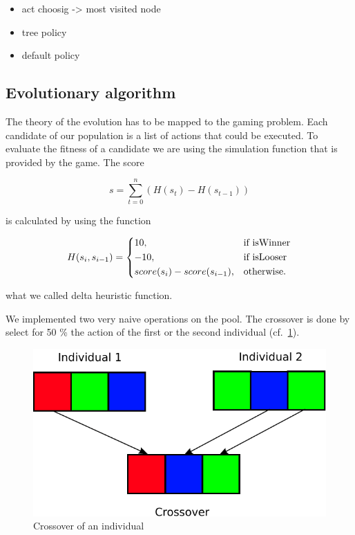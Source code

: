 \begin{itemize}
  \item act choosig -> most visited node
  \item tree policy
  \item default policy
\end{itemize}



\subsection{Evolutionary algorithm} 

The theory of the evolution has to be mapped to the gaming problem. Each candidate of our population is
a list of actions that could be executed. To evaluate the fitness of a candidate we are using the
simulation function that is provided by the game. 
The score

\begin{equation}
s = \sum_{t=0}^n (H(s_t) - H(s_{t-1}))
\end{equation}

is calculated by using the function

\begin{equation}
    H(s_i, s_{i-1}) = 
\begin{dcases}
    10, & \text{if isWinner}  \\
    -10, & \text{if isLooser}  \\
    score(s_i) - score(s_{i-1}), & \text{otherwise.}
\end{dcases}
\end{equation}

what we called delta heuristic function.

We implemented two very naive operations on the pool. The crossover is done by
select for 50 \% the action of the first or the second individual (cf.~\cref{fig:crossover}).

\begin{figure}[H]
\centering
\includegraphics[scale=0.6]{images/crossover.pdf}
\caption{Crossover of an individual}
\label{fig:crossover}
\end{figure}

